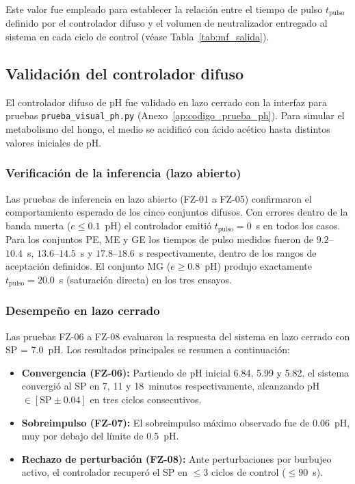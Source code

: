 Este valor fue empleado para establecer la relación entre el tiempo de pulso
$t_{\text{pulso}}$ definido por el controlador difuso y el volumen de neutralizador
entregado al sistema en cada ciclo de control (véase Tabla~\ref{tab:mf_salida}).

\subsection{Validación del controlador difuso}

El controlador difuso de pH fue validado en lazo cerrado con la interfaz para pruebas
\texttt{prueba\_visual\_ph.py} (Anexo~\ref{ap:codigo_prueba_ph}). Para simular el metabolismo del hongo, el
medio se acidificó con ácido acético hasta distintos valores iniciales de pH.

\subsubsection*{Verificación de la inferencia (lazo abierto)}

Las pruebas de inferencia en lazo abierto (FZ-01 a FZ-05) confirmaron el
comportamiento esperado de los cinco conjuntos difusos. Con errores dentro de la
banda muerta ($e \leq 0.1$~pH) el controlador emitió $t_\text{pulso} = 0$~s en todos
los casos. Para los conjuntos PE, ME y GE los tiempos de pulso medidos fueron de
$9.2$--$10.4$~s, $13.6$--$14.5$~s y $17.8$--$18.6$~s respectivamente, dentro
de los rangos de aceptación definidos. El conjunto MG ($e \geq 0.8$~pH) produjo
exactamente $t_\text{pulso} = 20.0$~s (saturación directa) en los tres ensayos.

\subsubsection*{Desempeño en lazo cerrado}

Las pruebas FZ-06 a FZ-08 evaluaron la respuesta del sistema en lazo cerrado con
SP = 7.0~pH. Los resultados principales se resumen a continuación:

\begin{itemize}
  \item \textbf{Convergencia (FZ-06):} Partiendo de pH inicial 6.84, 5.99 y 5.82,
  el sistema convergió al SP en 7, 11 y 18~minutos respectivamente,
  alcanzando pH $\in [\text{SP} \pm 0.04]$ en tres ciclos consecutivos.
  \item \textbf{Sobreimpulso (FZ-07):} El sobreimpulso máximo observado fue de
  $0.06$~pH, muy por debajo del límite de $0.5$~pH.
  \item \textbf{Rechazo de perturbación (FZ-08):} Ante perturbaciones por burbujeo
  activo, el controlador recuperó el SP en $\leq 3$ ciclos de control ($\leq 90$~s).
\end{itemize}

